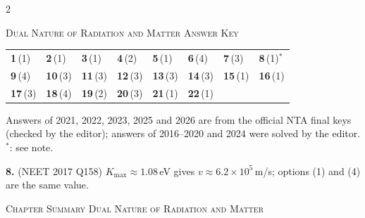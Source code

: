 \begin{multicols}{2}
{}
\numoptstrue
{}
{}
\end{multicols}
\par{}\vspace{12pt}
\begin{center}{}\par
{\large\color{navy}\scshape Dual Nature of Radiation and Matter \textperiodcentered{} Answer Key}\end{center}
{\small\setlength{\tabcolsep}{1pt}\renewcommand{\arraystretch}{1.5}
\begin{tabularx}{\linewidth}{@{}*{8}{>{\centering\arraybackslash}X}@{}}\toprule
\textbf{1}\,(1) & \textbf{2}\,(1) & \textbf{3}\,(1) & \textbf{4}\,(2) & \textbf{5}\,(1) & \textbf{6}\,(4) & \textbf{7}\,(3) & \textbf{8}\,(1)$^{*}$\\
\textbf{9}\,(4) & \textbf{10}\,(3) & \textbf{11}\,(3) & \textbf{12}\,(3) & \textbf{13}\,(3) & \textbf{14}\,(3) & \textbf{15}\,(1) & \textbf{16}\,(1)\\
\textbf{17}\,(3) & \textbf{18}\,(4) & \textbf{19}\,(2) & \textbf{20}\,(3) & \textbf{21}\,(1) & \textbf{22}\,(1) &  & \\\bottomrule\end{tabularx}}\par\smallskip
{\footnotesize Answers of 2021, 2022, 2023, 2025 and 2026 are from the official NTA final keys (checked by the editor); answers of 2016--2020 and 2024 were solved by the editor. $^{*}$: see note.
\par\smallskip\textbf{8.} (NEET 2017 Q158) $K_{\max}\approx1.08$\,eV gives $v\approx6.2\times10^5$\,m/s; options (1) and (4) are the same value.
}\par
\par{}\vspace{14pt}
\begin{center}{}\par
{\large\color{navy}\scshape Chapter Summary \textperiodcentered{} Dual Nature of Radiation and Matter}\end{center}

